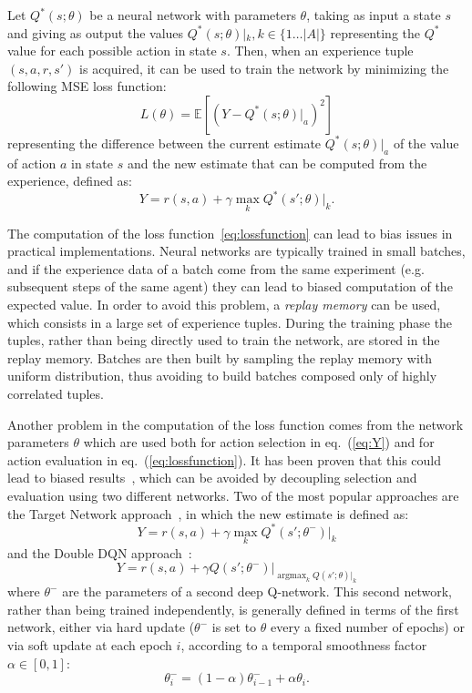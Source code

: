 \documentclass{article}
\DeclareMathOperator*{\argmax}{argmax}
\begin{document}
Let $Q^*(s;\theta)$ be a neural network with parameters $\theta$, taking as input a state $s$ and giving as output the values $Q^*(s;\theta)|_k, k\in\{1\ldots |A|\}$ representing the $Q^*$ value for each possible action in state $s$. Then, when an experience tuple $(s,a,r,s')$ is acquired, it can be used to train the network by minimizing the following MSE loss function:
\begin{equation}
L(\theta) = \mathbb{E}\left[ \left(Y - Q^*(s;\theta)|_a\right)^2 \right]
\label{eq:lossfunction}
\end{equation}
representing the difference between the current estimate $Q^*(s;\theta)|_a$ of the value of action $a$ in state $s$ and the new estimate that can be computed from the experience, defined as:
\begin{equation}
	Y = r(s,a) + \gamma \max_{k}Q^*(s';\theta)|_k.
	\label{eq:Y}
\end{equation}

The computation of the loss function~\ref{eq:lossfunction} can lead to bias issues in practical implementations. Neural networks are typically trained in small batches, and if the experience data of a batch come from the same experiment (e.g. subsequent steps of the same agent) they can lead to biased computation of the expected value. In order to avoid this problem, a \emph{replay memory} can be used, which consists in a large set of experience tuples. During the training phase the tuples, rather than being directly used to train the network, are stored in the replay memory. Batches are then built by sampling the replay memory with uniform distribution, thus avoiding to build batches composed only of highly  correlated tuples.

Another problem in the computation of the loss function comes from the network parameters $\theta$ which are used both for action selection in eq.~(\ref{eq:Y}) and for action evaluation in eq.~(\ref{eq:lossfunction}). It has been proven that this could lead to biased results~\cite{van2016deep}, which can be avoided by decoupling selection and evaluation using two different networks. Two of the most popular approaches are the Target Network approach~\cite{mnih2015human}, in which the new estimate is defined as:
\begin{equation}
Y= r(s,a) + \gamma \max_{k} Q^*(s';\theta^-)|_k
\label{eq:targetnetwork}
\end{equation}
and the Double DQN approach~\cite{van2016deep}:
\begin{equation}
Y = r(s,a) + \gamma Q(s';\theta^-)|_{\argmax_k Q(s'; \theta)|_k}
\label{eq:doubledqn}
\end{equation}
where $\theta^-$ are the parameters of a second deep Q-network. This second network, rather than being trained independently, is generally defined in terms of the first network, either via hard update ($\theta^-$ is set to $\theta$ every a fixed number of epochs) or via soft update at each epoch $i$, according to a temporal smoothness factor $\alpha\in[0,1]$:
\begin{equation}
	\theta^-_i = (1-\alpha)\theta^-_{i-1} + \alpha \theta_i.
	\label{eq:softupdate}
\end{equation}
\end{document}
